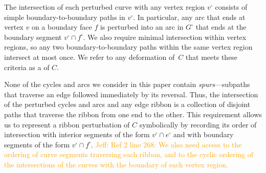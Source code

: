 \documentclass[letterpaper,review]{siamart190516}
\def\jnote#1{\textcolor{orange}{Jeff: #1}}
\begin{document}
The intersection of each perturbed curve with any vertex region $v^\square$ consists of simple boundary-to-boundary paths in $v^\square$.  In particular, any arc that ends at vertex $v$ on a boundary face $f$ is perturbed into an arc in $G^\square$ that ends at the boundary segment $v^\square \cap f^\square$.  We also require minimal intersection within vertex regions, so any two boundary-to-boundary paths within the same vertex region intersect at most once.  We refer to any deformation of~$C$ that meets these criteria as a  of $C$.

None of the cycles and arcs we consider in this paper contain \emph{spurs}—subpaths that traverse an edge followed immediately by its reversal.  Thus, the intersection of the perturbed cycles and arcs and any edge ribbon is a collection of disjoint paths that traverse the ribbon from one end to the other.  This requirement allows us to represent a ribbon perturbation of $C$ symbolically by recording its order of intersection with interior segments of the form $v^\square\cap e^\square$ and with boundary segments of the form $v^\square\cap f^\square$. \jnote{Ref 2 line 268: We also need access to the ordering of curve segments traversing each ribbon, and to the cyclic ordering of the intersections of the curves with the boundary of each vertex region.}
\end{document}
